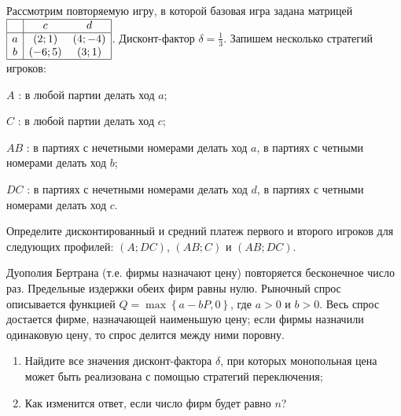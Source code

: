 \begin{problem}

Рассмотрим повторяемую игру, в которой базовая игра задана матрицей  $\begin{array}{|c|cc|}  \hline {} & {c} & {d} \\  \hline {a} & {\left(2;1\right)} & {\left(4;-4\right)} \\ {b} & {\left(-6;5\right)} & {\left(3;1\right)} \\  \hline  \end{array}$. Дисконт-фактор  $\delta =\frac{1}{3} $.
Запишем несколько стратегий игроков:\par
 $A$ : в любой партии делать ход  $a$;\par
 $C$ : в любой партии делать ход  $c$;\par
 $AB$ : в партиях с нечетными номерами делать ход  $a$, в партиях с четными номерами делать ход  $b$;\par
 $DC$ : в партиях с нечетными номерами делать ход  $d$, в партиях с четными номерами делать ход  $c$.\par
\item       Определите дисконтированный и средний платеж первого и второго игроков для следующих профилей:  $\left(A;DC\right)$,  $\left(AB;C\right)$  и  $\left(AB;DC\right)$.



\begin{sol}

\end{sol}
\end{problem}



\begin{problem}

Дуополия Бертрана (т.е. фирмы назначают цену) повторяется бесконечное число раз. Предельные издержки обеих фирм равны нулю. Рыночный спрос описывается функцией  $Q=\max \left\{a-bP,0\right\}$, где  $a>0$  и  $b>0$. Весь спрос достается фирме, назначающей наименьшую цену; если фирмы назначили одинаковую цену, то спрос делится между ними поровну.
\begin{enumerate}
\item Найдите все значения дисконт-фактора  $\delta $, при которых монопольная цена может быть реализована с помощью стратегий переключения;

\item Как изменится ответ, если число фирм будет равно $n$?
\end{enumerate}


\begin{sol}

\end{sol}
\end{problem}



